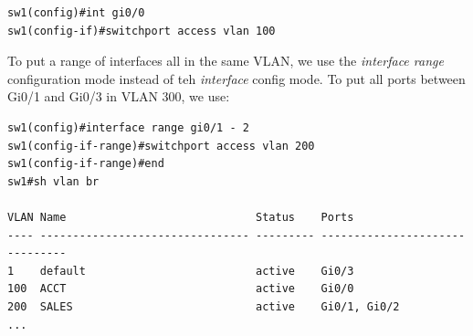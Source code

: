 \vspace{-15pt}
\begin{verbatim}
sw1(config)#int gi0/0
sw1(config-if)#switchport access vlan 100
\end{verbatim}
\vspace{-10pt}

\noindent
To put a range of interfaces all in the same VLAN, we use the \textit{interface range} configuration mode instead of teh \textit{interface} config mode. To put all ports between Gi0/1 and Gi0/3 in VLAN 300, we use: 

\vspace{-15pt}
\begin{verbatim}
sw1(config)#interface range gi0/1 - 2
sw1(config-if-range)#switchport access vlan 200
sw1(config-if-range)#end
sw1#sh vlan br

VLAN Name                             Status    Ports
---- -------------------------------- --------- -------------------------------
1    default                          active    Gi0/3
100  ACCT                             active    Gi0/0
200  SALES                            active    Gi0/1, Gi0/2
...
\end{verbatim}
\vspace{-10pt}